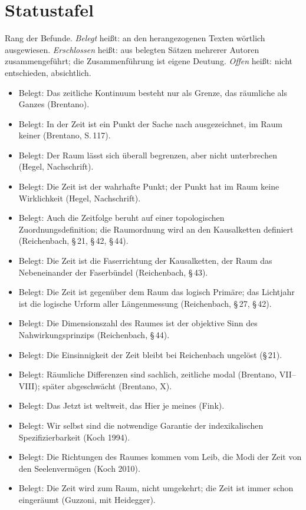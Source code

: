 \chapter{Statustafel}

Rang der Befunde. \emph{Belegt} heißt: an den herangezogenen Texten wörtlich ausgewiesen. \emph{Erschlossen} heißt: aus belegten Sätzen mehrerer Autoren zusammengeführt; die Zusammenführung ist eigene Deutung. \emph{Offen} heißt: nicht entschieden, absichtlich.

\begin{itemize}
\item Belegt: Das zeitliche Kontinuum besteht nur als Grenze, das räumliche als Ganzes (Brentano).
\item Belegt: In der Zeit ist ein Punkt der Sache nach ausgezeichnet, im Raum keiner (Brentano, S.\,117).
\item Belegt: Der Raum lässt sich überall begrenzen, aber nicht unterbrechen (Hegel, Nachschrift).
\item Belegt: Die Zeit ist der wahrhafte Punkt; der Punkt hat im Raum keine Wirklichkeit (Hegel, Nachschrift).
\item Belegt: Auch die Zeitfolge beruht auf einer topologischen Zuordnungsdefinition; die Raumordnung wird an den Kausalketten definiert (Reichenbach, \S\,21, \S\,42, \S\,44).
\item Belegt: Die Zeit ist die Faserrichtung der Kausalketten, der Raum das Nebeneinander der Faserbündel (Reichenbach, \S\,43).
\item Belegt: Die Zeit ist gegenüber dem Raum das logisch Primäre; das Lichtjahr ist die logische Urform aller Längenmessung (Reichenbach, \S\,27, \S\,42).
\item Belegt: Die Dimensionszahl des Raumes ist der objektive Sinn des Nahwirkungsprinzips (Reichenbach, \S\,44).
\item Belegt: Die Einsinnigkeit der Zeit bleibt bei Reichenbach ungelöst (\S\,21).
\item Belegt: Räumliche Differenzen sind sachlich, zeitliche modal (Brentano, VII--VIII); später abgeschwächt (Brentano, X).
\item Belegt: Das Jetzt ist weltweit, das Hier je meines (Fink).
\item Belegt: Wir selbst sind die notwendige Garantie der indexikalischen Spezifizierbarkeit (Koch 1994).
\item Belegt: Die Richtungen des Raumes kommen vom Leib, die Modi der Zeit von den Seelenvermögen (Koch 2010).
\item Belegt: Die Zeit wird zum Raum, nicht umgekehrt; die Zeit ist immer schon eingeräumt (Guzzoni, mit Heidegger).

\end{itemize}
